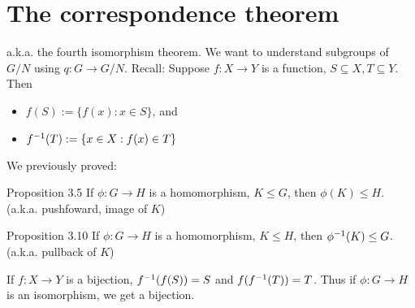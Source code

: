 \section{The correspondence theorem}
a.k.a. the fourth isomorphism theorem. We want to understand subgroups of $G/N$ using $q:G\to G/N$. Recall: Suppose $f:X\to Y$ is a function, $S\subseteq X, T\subseteq Y$. Then 
\begin{itemize}
	\item $f(S):= \{f(x):x\in S\}$, and 
	\item $f^{-1} (T):=\{x\in X: f(x)\in T\}$
\end{itemize}
We previously proved:
\begin{law}{Proposition 3.5}
If $\phi:G\to H$ is a homomorphism, $K\le G$, then $\phi(K)\le H$. (a.k.a. pushfoward, image of $K$)
\end{law}

\begin{law}{Proposition 3.10}
	If $\phi:G\to H$ is a homomorphism, $K\le H$, then $\phi^{-1}(K)\le G$. (a.k.a. pullback of $K$)
\end{law}

If $f:X\to Y$ is a bijection, $f^{-1}(f(S))=S$ and $f(f^{-1} (T))=T$. Thus if $\phi:G\to H$ is an isomorphism, we get a bijection.

